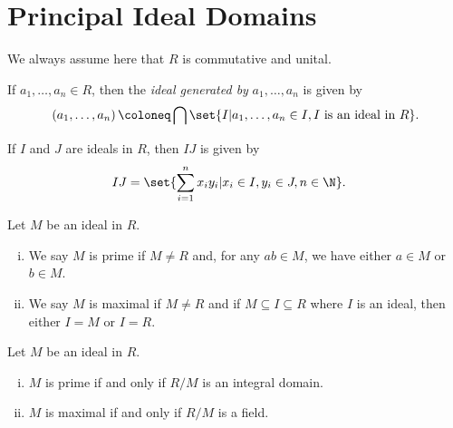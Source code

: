 \documentclass[10pt]{mypackage}
\begin{document}
\RaggedRight
\section{Principal Ideal Domains}%
We always assume here that $R$ is commutative and unital.
\begin{definition}
  If $a_1,\dots,a_n\in R$, then the \textit{ideal generated by} $a_1,\dots,a_n$ is given by
  \begin{align*}
    \left( a_1,\dots,a_n \right) \coloneq \bigcap\set{I | a_1,\dots,a_n\in I,I\text{ is an ideal in }R}.
  \end{align*}
\end{definition}
\begin{definition}
  If $I$ and $J$ are ideals in $R$, then $IJ$ is given by
  \begin{align*}
    IJ &= \set{\sum_{i=1}^{n}x_iy_i | x_i\in I, y_i\in J,n\in \N}.
  \end{align*}
\end{definition}
\begin{definition}
  Let $M$ be an ideal in $R$.
  \begin{enumerate}[(i)]
    \item We say $M$ is prime if $M\neq R$ and, for any $ab\in M$, we have either $a\in M$ or $b\in M$.
    \item We say $M$ is maximal if $M\neq R$ and if $M\subseteq I\subseteq R$ where $I$ is an ideal, then either $I = M$ or $I = R$.
  \end{enumerate}
\end{definition}
\begin{theorem}
  Let $M$ be an ideal in $R$.
  \begin{enumerate}[(i)]
    \item $M$ is prime if and only if $R/M$ is an integral domain.
    \item $M$ is maximal if and only if $R/M$ is a field.
  \end{enumerate}
\end{theorem}
\end{document}
